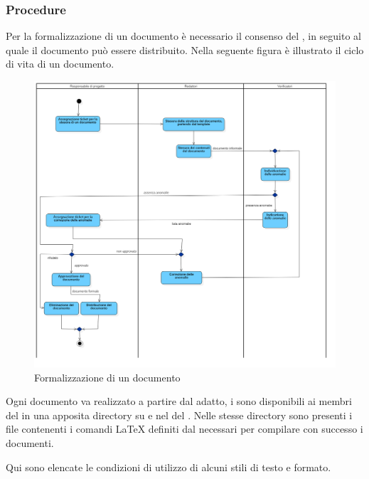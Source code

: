\documentclass[a4paper, titlepage]{article}
\begin{document}
\subsubsection{Procedure}

Per la formalizzazione di un documento è necessario il consenso del , in seguito al quale il documento può essere distribuito.
Nella seguente figura è illustrato il ciclo di vita di un documento.
\begin{figure}[!h]
	\includegraphics[width=\textwidth]{Img/docflow.png}
	\caption{Formalizzazione di un documento}
	\label{fig:documento}
\end{figure}
\newpage

Ogni documento va realizzato a partire dal  adatto, i  sono disponibili ai membri del  in una apposita directory su  e nel   del .
Nelle stesse directory sono presenti i file contenenti i comandi \LaTeX{} definiti dal  necessari per compilare con successo i documenti.

Qui sono elencate le condizioni di utilizzo di alcuni stili di testo e formato.
\end{document}
